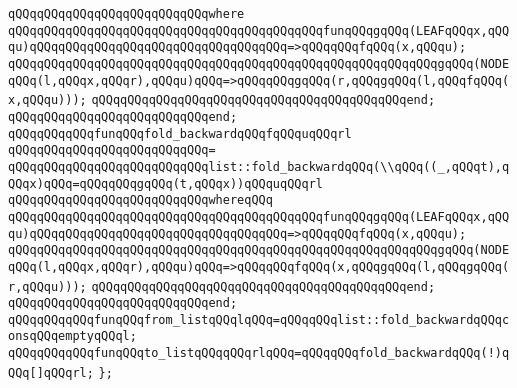 \verb|qQQqqQQqqQQqqQQqqQQqqQQqqQQqwhere|\newline
\verb|qQQqqQQqqQQqqQQqqQQqqQQqqQQqqQQqqQQqqQQqqQQqfunqQQqgqQQq(LEAFqQQqx,qQQqu)qQQqqQQqqQQqqQQqqQQqqQQqqQQqqQQqqQQq=>qQQqqQQqfqQQq(x,qQQqu);|\newline
\verb|qQQqqQQqqQQqqQQqqQQqqQQqqQQqqQQqqQQqqQQqqQQqqQQqqQQqqQQqqQQqgqQQq(NODEqQQq(l,qQQqx,qQQqr),qQQqu)qQQq=>qQQqqQQqgqQQq(r,qQQqgqQQq(l,qQQqfqQQq(x,qQQqu)));|\newline
\verb|qQQqqQQqqQQqqQQqqQQqqQQqqQQqqQQqqQQqqQQqqQQqend;|\newline
\verb|qQQqqQQqqQQqqQQqqQQqqQQqqQQqend;|\newline
\newline
\verb|qQQqqQQqqQQqfunqQQqfold_backwardqQQqfqQQquqQQqrl|\newline
\verb|qQQqqQQqqQQqqQQqqQQqqQQqqQQq=|\newline
\verb|qQQqqQQqqQQqqQQqqQQqqQQqqQQqlist::fold_backwardqQQq(\\qQQq((_,qQQqt),qQQqx)qQQq=qQQqqQQqgqQQq(t,qQQqx))qQQquqQQqrl|\newline
\verb|qQQqqQQqqQQqqQQqqQQqqQQqqQQqwhereqQQq|\newline
\verb|qQQqqQQqqQQqqQQqqQQqqQQqqQQqqQQqqQQqqQQqqQQqfunqQQqgqQQq(LEAFqQQqx,qQQqu)qQQqqQQqqQQqqQQqqQQqqQQqqQQqqQQqqQQq=>qQQqqQQqfqQQq(x,qQQqu);|\newline
\verb|qQQqqQQqqQQqqQQqqQQqqQQqqQQqqQQqqQQqqQQqqQQqqQQqqQQqqQQqqQQqgqQQq(NODEqQQq(l,qQQqx,qQQqr),qQQqu)qQQq=>qQQqqQQqfqQQq(x,qQQqgqQQq(l,qQQqgqQQq(r,qQQqu)));|\newline
\verb|qQQqqQQqqQQqqQQqqQQqqQQqqQQqqQQqqQQqqQQqqQQqend;|\newline
\verb|qQQqqQQqqQQqqQQqqQQqqQQqqQQqend;|\newline
\newline
\verb|qQQqqQQqqQQqfunqQQqfrom_listqQQqlqQQq=qQQqqQQqlist::fold_backwardqQQqconsqQQqemptyqQQql;|\newline
\verb|qQQqqQQqqQQqfunqQQqto_listqQQqqQQqrlqQQq=qQQqqQQqfold_backwardqQQq(!)qQQq[]qQQqrl;|\newline
\newline
\verb|};|\newline
\newline
\newline

